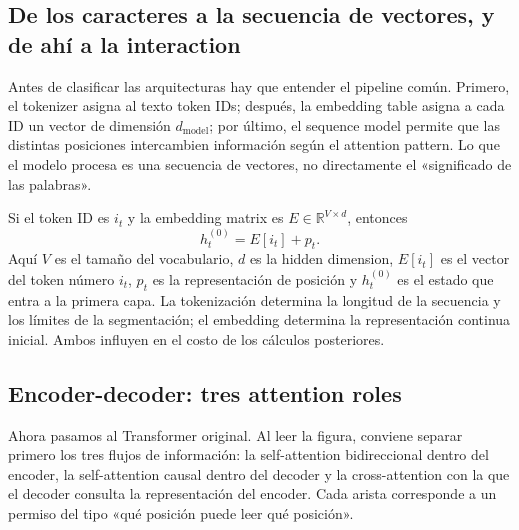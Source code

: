 \subsection{De los caracteres a la secuencia de vectores, y de ahí a la interaction}

Antes de clasificar las arquitecturas hay que entender el pipeline común. Primero, el tokenizer asigna al texto token IDs; después, la embedding table asigna a cada ID un vector de dimensión $d_{\text{model}}$; por último, el sequence model permite que las distintas posiciones intercambien información según el attention pattern. Lo que el modelo procesa es una secuencia de vectores, no directamente el «significado de las palabras».



Si el token ID es $i_t$ y la embedding matrix es $E\in\mathbb{R}^{V\times d}$, entonces
\[
h_t^{(0)}=E[i_t]+p_t.
\]
Aquí $V$ es el tamaño del vocabulario, $d$ es la hidden dimension, $E[i_t]$ es el vector del token número $i_t$, $p_t$ es la representación de posición y $h_t^{(0)}$ es el estado que entra a la primera capa. La tokenización determina la longitud de la secuencia y los límites de la segmentación; el embedding determina la representación continua inicial. Ambos influyen en el costo de los cálculos posteriores.


\subsection{Encoder-decoder: tres attention roles}

Ahora pasamos al Transformer original. Al leer la figura, conviene separar primero los tres flujos de información: la self-attention bidireccional dentro del encoder, la self-attention causal dentro del decoder y la cross-attention con la que el decoder consulta la representación del encoder. Cada arista corresponde a un permiso del tipo «qué posición puede leer qué posición».

